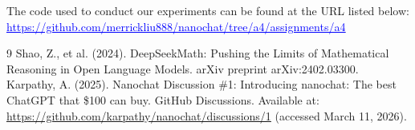 \documentclass[a4paper,12pt]{article}
\newcommand{\bluehref}[2]{\href{#1}{\textcolor{blue}{\uline{#2}}}}
\begin{document}
The code used to conduct our experiments can be found at the URL listed below:\\ \bluehref{https://github.com/merrickliu888/nanochat/tree/a4/assignments/a4}{https://github.com/merrickliu888/nanochat/tree/a4/assignments/a4}

\begin{thebibliography}{9}
 Shao, Z., et al. (2024). DeepSeekMath: Pushing the Limits of Mathematical Reasoning in Open Language Models. arXiv preprint arXiv:2402.03300.
Karpathy, A. (2025). Nanochat Discussion \#1: Introducing nanochat: The best ChatGPT that \$100 can buy. GitHub Discussions. Available at: \url{https://github.com/karpathy/nanochat/discussions/1} (accessed March 11, 2026).

\end{thebibliography}
\end{document}
